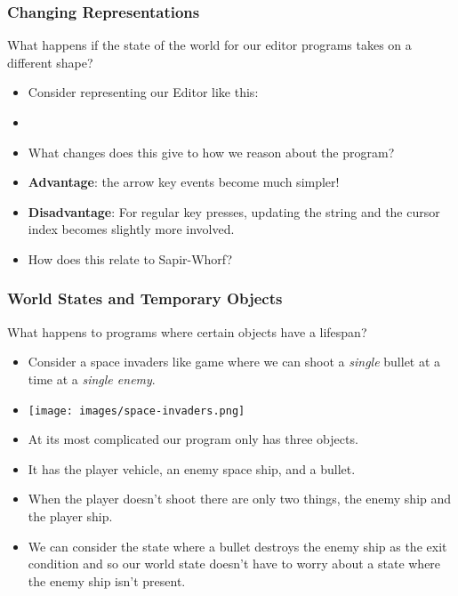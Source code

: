 \documentclass{beamer}
\begin{document}
\begin{frame}
  \frametitle{Changing Representations}
  What happens if the state of the world for our editor programs takes on a
  different shape?
  \begin{itemize}
  \item<2-> Consider representing our Editor like this:
  \item<3-> \EditorNumberState
  \item<4-> What changes does this give to how we reason about the program?
  \item<5-> \textbf{Advantage}: the arrow key events become much simpler!
  \item<6-> \textbf{Disadvantage}: For regular key presses, updating the
    string and the cursor index becomes slightly more involved.    
  \item<7-> How does this relate to Sapir-Whorf?
  \end{itemize}
\end{frame}

\begin{frame}
  \frametitle{World States and Temporary Objects}
  What happens to programs where certain objects have a lifespan?
  \begin{itemize}
  \item<2-> Consider a space invaders like game where we can shoot
    a \emph{single} bullet at a time at a \emph{single enemy}.
  \item<3-> \texttt{[image: images/space-invaders.png]}
  \item<4-> At its most complicated our program only has three objects.
  \item<5-> It has the player vehicle, an enemy space ship, and a
    bullet.
  \item<6-> When the player doesn't shoot there are only two things,
    the enemy ship and the player ship.
  \item<7-> We can consider the state where a bullet destroys the enemy ship
    as the exit condition and so our world state doesn't have to worry about
    a state where the enemy ship isn't present.
  \end{itemize}
\end{frame}
\end{document}
